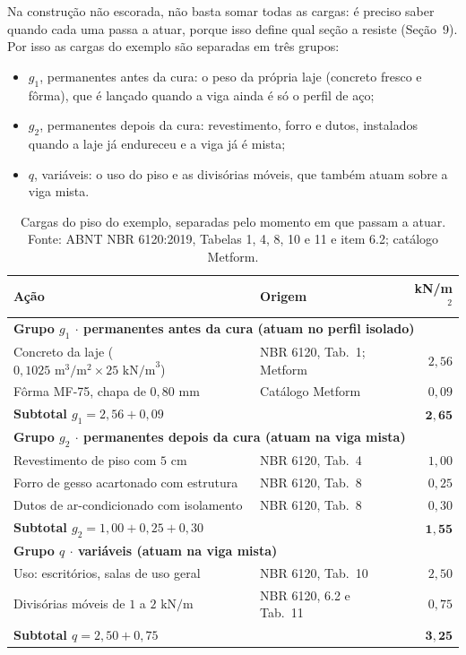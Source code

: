 \documentclass[11pt,a4paper]{article}
\begin{document}
Na construção não escorada, não basta somar todas as cargas: é preciso saber quando cada uma passa a atuar, porque isso define qual seção a resiste (Seção~9). Por isso as cargas do exemplo são separadas em três grupos:
\begin{itemize}
  \item $g_1$, permanentes antes da cura: o peso da própria laje (concreto fresco e fôrma), que é lançado quando a viga ainda é só o perfil de aço;
  \item $g_2$, permanentes depois da cura: revestimento, forro e dutos, instalados quando a laje já endureceu e a viga já é mista;
  \item $q$, variáveis: o uso do piso e as divisórias móveis, que também atuam sobre a viga mista.
\end{itemize}

\begin{table}[!htbp]
  \centering
  \caption{Cargas do piso do exemplo, separadas pelo momento em que passam a atuar. Fonte: ABNT NBR 6120:2019, Tabelas 1, 4, 8, 10 e 11 e item 6.2; catálogo Metform.}
  \label{tab:cargas-piso}
  \small
  \begin{tabularx}{\linewidth}{Xlr}
    \toprule
    \textbf{Ação} & \textbf{Origem} & \textbf{kN/m$^2$} \\
    \midrule
    \multicolumn{3}{l}{\textbf{Grupo $g_1$ $\cdot$ permanentes antes da cura (atuam no perfil isolado)}} \\
    Concreto da laje ($0{,}1025\text{ m}^3/\text{m}^2 \times 25\text{ kN/m}^3$) & NBR 6120, Tab.\ 1; Metform & $2{,}56$ \\
    Fôrma MF-75, chapa de $0{,}80\text{ mm}$ & Catálogo Metform & $0{,}09$ \\
    \textbf{Subtotal $g_1 = 2{,}56 + 0{,}09$} & & $\mathbf{2{,}65}$ \\
    \midrule
    \multicolumn{3}{l}{\textbf{Grupo $g_2$ $\cdot$ permanentes depois da cura (atuam na viga mista)}} \\
    Revestimento de piso com $5\text{ cm}$ & NBR 6120, Tab.\ 4 & $1{,}00$ \\
    Forro de gesso acartonado com estrutura & NBR 6120, Tab.\ 8 & $0{,}25$ \\
    Dutos de ar-condicionado com isolamento & NBR 6120, Tab.\ 8 & $0{,}30$ \\
    \textbf{Subtotal $g_2 = 1{,}00 + 0{,}25 + 0{,}30$} & & $\mathbf{1{,}55}$ \\
    \midrule
    \multicolumn{3}{l}{\textbf{Grupo $q$ $\cdot$ variáveis (atuam na viga mista)}} \\
    Uso: escritórios, salas de uso geral & NBR 6120, Tab.\ 10 & $2{,}50$ \\
    Divisórias móveis de $1$ a $2\text{ kN/m}$ & NBR 6120, 6.2 e Tab.\ 11 & $0{,}75$ \\
    \textbf{Subtotal $q = 2{,}50 + 0{,}75$} & & $\mathbf{3{,}25}$ \\
    \bottomrule
  \end{tabularx}
\end{table}
\end{document}
